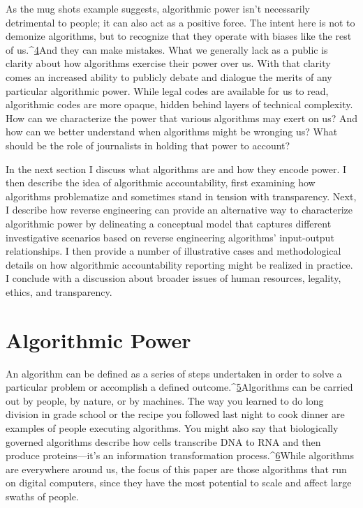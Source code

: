 As the mug shots example suggests, algorithmic power isn't necessarily detrimental to people; it can also act as a positive force. The intent here is not to demonize algorithms, but to recognize that they operate with biases like the rest of us.^{\href{#endnotes}{4}}And they can make mistakes. What we generally lack as a public is clarity about how algorithms exercise their power over us. With that clarity comes an increased ability to publicly debate and dialogue the merits of any particular algorithmic power. While legal codes are available for us to read, algorithmic codes are more opaque, hidden behind layers of technical complexity. How can we characterize the power that various algorithms may exert on us? And how can we better understand when algorithms might be wronging us? What should be the role of journalists in holding that power to account? 

In the next section I discuss what algorithms are and how they encode power. I then describe the idea of algorithmic accountability, first examining how algorithms problematize and sometimes stand in tension with transparency. Next, I describe how reverse engineering can provide an alternative way to characterize algorithmic power by delineating a conceptual model that captures different investigative scenarios based on reverse engineering algorithms' input-output relationships. I then provide a number of illustrative cases and methodological details on how algorithmic accountability reporting might be realized in practice. I conclude with a discussion about broader issues of human resources, legality, ethics, and transparency. 

\chapter{Algorithmic Power }
An algorithm can be defined as a series of steps undertaken in order to solve a particular problem or accomplish a defined outcome.^{\href{#endnotes}{5}}Algorithms can be carried out by people, by nature, or by machines. The way you learned to do long division in grade school or the recipe you followed last night to cook dinner are examples of people executing algorithms. You might also say that biologically governed algorithms describe how cells transcribe DNA to RNA and then produce proteins—it's an information transformation process.^{\href{#endnotes}{6}}While algorithms are everywhere around us, the focus of this paper are those algorithms that run on digital computers, since they have the most potential to scale and affect large swaths of people. 

